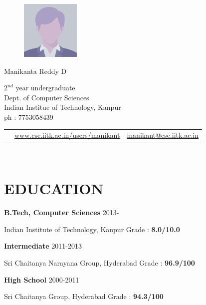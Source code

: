 \documentclass{article}
\newcommand{\sepspace}{\vspace*{0.8em}}
\newcommand{\MyName}[1]{
		\huge \usefont{OT1}{phv}{b}{n} \hfill #1 		
		\normalsize \normalfont
		}
\newcommand{\NewPart}[1]{\section*{\uppercase{#1}}}
\newcommand{\SkillsEntry}[3]{#1 & #2 & #3\\}
\newcommand{\EducationEntry}[4]{
		\noindent \textbf{#1} \hfill 	{#2} \par				
		\noindent #3 \hfill	
		Grade : \textbf{#4} 	
		}
\begin{document}
\begin{figure}
	\vspace*{-3em}
		\includegraphics[width=0.25\textwidth]{photo.png}
\end{figure}

\MyName{Manikanta Reddy D}
\begin{flushright}
	$2^{nd}$ year undergraduate\\
	Dept. of Computer Sciences\\
	Indian Institue of Technology, Kanpur\\
	ph : 7753058439
	\begin{tabular}{m{}  m{} m{}}
	\SkillsEntry{}{\footnotesize{\url{www.cse.iitk.ac.in/users/manikant}}}{\footnotesize{\url{manikant@cse.iitk.ac.in}}}
	\end{tabular}
\end{flushright}

\\

\NewPart{Education}{}

\EducationEntry{B.Tech, Computer Sciences}{2013-}{Indian Institute of Technology, Kanpur}{8.0/10.0}

\sepspace

\EducationEntry{Intermediate}{2011-2013}{Sri Chaitanya Narayana Group, Hyderabad}{96.9/100}

\sepspace

\EducationEntry{High School}{2000-2011}{Sri Chaitanya Group, Hyderabad}{94.3/100}

\end{document}
